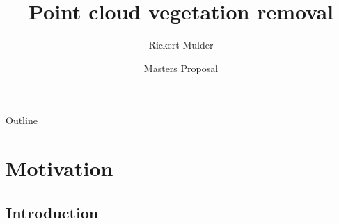 \documentclass{beamer}
\title{Point cloud vegetation removal}
\author{Rickert Mulder}
\institute[U of X]
{
  Department of Computer Science\\
  University of Cape Town
}
\date[CFP 2003] %
{Masters Proposal}
\begin{document}
\begin{frame}
  \titlepage
\end{frame}

\begin{frame}{Outline}
  \tableofcontents
\end{frame}





\section{Motivation}

\subsection{Introduction}
\end{document}
